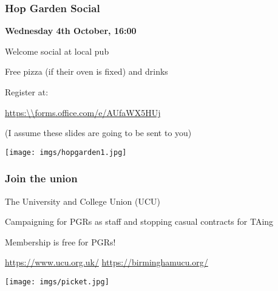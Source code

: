 \begin{frame}
    \frametitle{Hop Garden Social}
    \centering

    \textbf{\LARGE Wednesday 4th October, 16:00}

    \vspace{1em}

    \begin{minipage}{0.4\textwidth}
        \centering

        Welcome social at local pub

        Free \alert{pizza}
        {\scriptsize(if their oven is fixed)}
        and \alert{drinks}

        \vspace{1em}

        Register at:

        {\small\url{https:\\forms.office.com/e/AUfaWX5HUj}}

        \vspace{1em}

        \scriptsize
        (I assume these slides are going to be sent to you)
    \end{minipage}
    \qquad
    \begin{minipage}{0.4\textwidth}
        \texttt{[image: imgs/hopgarden1.jpg]}
    \end{minipage}
\end{frame}
\begin{frame}
    \frametitle{Join the union}
    \centering
    \begin{minipage}{0.40\textwidth}
        \centering
        The University and College Union (UCU)

        \vspace{1em}

        Campaigning for \alert{PGRs as staff} and stopping
        \alert{casual contracts} for TAing

        \vspace{1em}

        Membership is \alert{free} for PGRs!

        \vspace{1em}

        \url{https://www.ucu.org.uk/}
        \url{https://birminghamucu.org/}

    \end{minipage}
    \qquad
    \begin{minipage}{0.4\textwidth}
        \texttt{[image: imgs/picket.jpg]}
    \end{minipage}
\end{frame}
